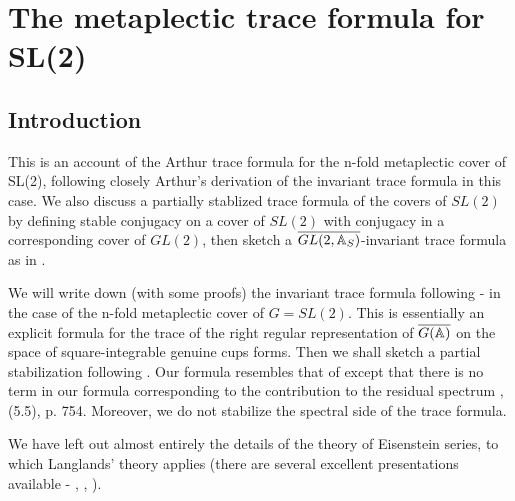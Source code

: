 \chapter{The metaplectic trace formula for SL(2)}

\section{Introduction}
This is an account of the Arthur trace formula for the
n-fold metaplectic cover of SL(2), following closely
Arthur's derivation of the invariant trace formula in this case.
We also discuss a partially stablized trace formula of
the covers of $SL(2)$ by defining
stable conjugacy on a cover of $SL(2)$ with conjugacy
in a corresponding cover of $GL(2)$,
then sketch a $\overline{GL(2,{\Bbb{A}}_S)}$-invariant
trace formula as in \cite{LL}.

We will write down (with some proofs) the invariant trace
formula following \cite{A2}-\cite{A15} in the case of the
n-fold metaplectic cover of $G=SL(2)$.
This is essentially an explicit formula for the trace of
the right regular representation of
$\overline{G({\Bbb{A}})}$ on the space of square-integrable
genuine cups forms.
Then we shall sketch a partial stabilization following \cite{LL}.
Our formula resembles that of \cite{LL} except that there
is no term in our formula corresponding to the
contribution to the residual spectrum
\cite{LL}, (5.5), p. 754. Moreover, we do not stabilize the spectral
side of the trace formula.

We have left out almost entirely the details of the theory of
Eisenstein series, to which Langlands' theory applies
(there are several excellent presentations available -
\cite{L1}, \cite{L2}, \cite{K2}).



